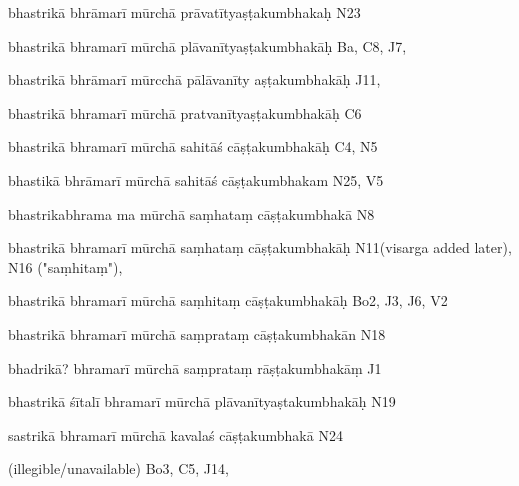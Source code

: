 \begin{ekdosis}
\begin{marma}[hp01_055]
\begin{marma}[hp02_009]
\begin{marma}[hp02_011]
\begin{marma}[hp02_44cd]
      \item[bhastrikā bhrāmarī mūrchā prāvatītyaṣṭakumbhakaḥ] N23 
      \item[bhastrikā bhramarī mūrchā plāvanītyaṣṭakumbhakāḥ] Ba, C8, J7, 
      \item[bhastrikā bhrāmarī mūrcchā pālāvanīty aṣṭakumbhakāḥ] J11,
      \item[bhastrikā bhramarī mūrchā pratvanītyaṣṭakumbhakāḥ] C6
      \item[bhastrikā bhramarī mūrchā sahitāś cāṣṭakumbhakāḥ] C4, N5
      \item[bhastikā bhrāmarī mūrchā sahitāś cāṣṭakumbhakam] N25, V5
      \item[bhastrikabhrama ma mūrchā saṃhataṃ cāṣṭakumbhakā] N8
      \item[bhastrikā bhramarī mūrchā saṃhataṃ cāṣṭakumbhakāḥ] N11(visarga added later), N16 ("saṃhitaṃ"),
      \item[bhastrikā bhramarī mūrchā saṃhitaṃ cāṣṭakumbhakāḥ] Bo2, J3, J6, V2
      \item[bhastrikā bhramarī mūrchā saṃprataṃ cāṣṭakumbhakān] N18
      \item[bhadrikā? bhramarī mūrchā saṃprataṃ rāṣṭakumbhakāṃ] J1
      \item[bhastrikā śītalī bhramarī mūrchā plāvanītyaṣtakumbhakāḥ] N19 
      \item[sastrikā bhramarī mūrchā kavalaś cāṣṭakumbhakā] N24
      \item[(illegible/unavailable)] Bo3, C5, J14, 
        \begin{description}

        \end{description}
      \end{marma}


\end{marma}
\end{marma}
\end{marma}
\end{ekdosis}
